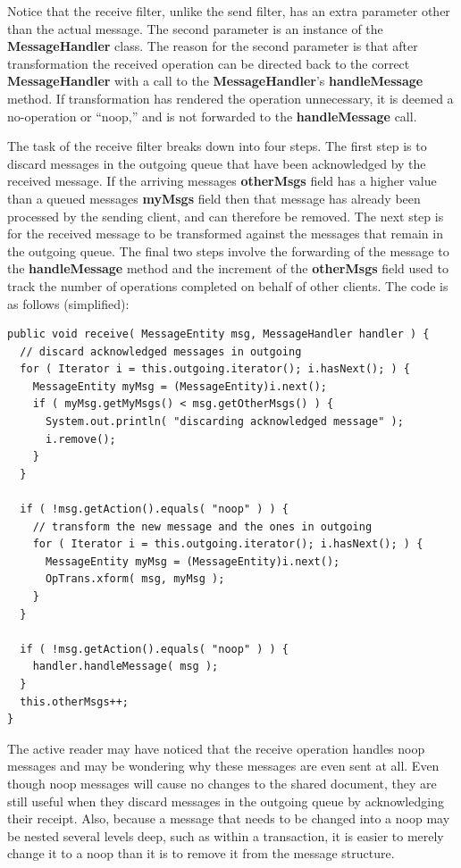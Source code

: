 \documentclass{article}
\begin{document}
Notice that the receive filter, unlike the send filter, has an extra
parameter other than the actual message.  The second parameter is an
instance of the \textbf{MessageHandler} class.  The reason for the
second parameter is that after transformation the received operation
can be directed back to the correct \textbf{MessageHandler} with a
call to the \textbf{MessageHandler}'s \textbf{handleMessage} method.
If transformation has rendered the operation unnecessary, it is deemed
a no-operation or ``noop,'' and is not forwarded to the
\textbf{handleMessage} call.

The task of the receive filter breaks down into four steps.  The first
step is to discard messages in the outgoing queue that have been
acknowledged by the received message.  If the arriving messages
\textbf{otherMsgs} field has a higher value than a queued messages
\textbf{myMsgs} field
then that message has already been processed by the sending client,
and can therefore be removed.  The next step is for the received
message to be transformed against the messages that remain in the
outgoing queue.  The final two steps involve the forwarding of the
message to the \textbf{handleMessage} method and the increment of the
\textbf{otherMsgs}
field used to track the number of operations completed on behalf of
other clients.  The code is as follows (simplified):

\begin{verbatim}
public void receive( MessageEntity msg, MessageHandler handler ) {
  // discard acknowledged messages in outgoing
  for ( Iterator i = this.outgoing.iterator(); i.hasNext(); ) {
    MessageEntity myMsg = (MessageEntity)i.next();
    if ( myMsg.getMyMsgs() < msg.getOtherMsgs() ) {
      System.out.println( "discarding acknowledged message" );
      i.remove();
    }
  }

  if ( !msg.getAction().equals( "noop" ) ) {
    // transform the new message and the ones in outgoing
    for ( Iterator i = this.outgoing.iterator(); i.hasNext(); ) {
      MessageEntity myMsg = (MessageEntity)i.next();
      OpTrans.xform( msg, myMsg );
    }
  }

  if ( !msg.getAction().equals( "noop" ) ) {
    handler.handleMessage( msg );
  }
  this.otherMsgs++;
}
\end{verbatim}

The active reader may have noticed that the receive operation handles
noop messages and may be wondering why these messages are even sent at
all.  Even though noop messages will cause no changes to the shared
document, they are still useful when they discard messages in the
outgoing queue by acknowledging their receipt.  Also, because a
message that needs to be changed into a noop may be nested several
levels deep, such as within a transaction, it is easier to merely
change it to a noop than it is to remove it from the message
structure.
\end{document}
